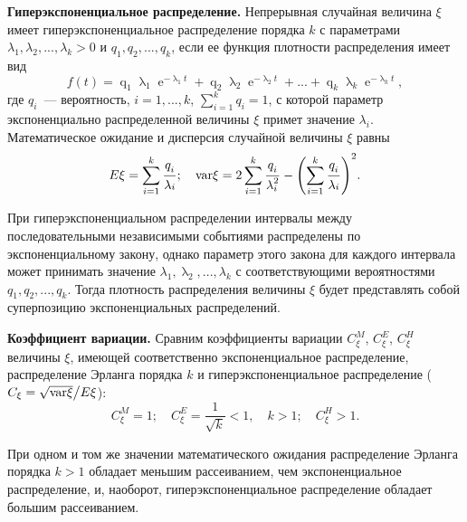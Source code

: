 \textbf{Гиперэкспоненциальное распределение.} Непрерывная случайная величина $\xi$ имеет гиперэкспоненциальное распределение порядка $k$ с параметрами $\lambda_1,\lambda_2,...,\lambda_k > 0$ и $q_1,q_2,...,q_k$, если ее функция плотности распределения имеет вид
\begin{equation*}
f(t) = \mathop q\nolimits_1 \mathop \lambda \nolimits_1 \mathop e\nolimits^{ - \mathop \lambda \nolimits_1 t}  + \mathop q\nolimits_2 \mathop \lambda \nolimits_2 \mathop e\nolimits^{ - \mathop \lambda \nolimits_2 t}  + ... + \mathop q\nolimits_k  \mathop \lambda \nolimits_k  \mathop e\nolimits^{ - \mathop \lambda \nolimits_k  t},
\end{equation*}
где $q_i$~--- вероятность, $i = 1,...,k$, $\sum\limits_{i = 1}^k  q_i = 1$, с которой параметр экспоненциально распределенной величины $\xi$ примет значение $\lambda_i$. Математическое ожидание и дисперсия случайной величины $\xi$ равны
\begin{equation*}
E\xi  = \sum\limits_{i = 1}^k  {\frac{{\mathop q\nolimits_i }}{{\mathop \lambda \nolimits_i }}}; \quad {\mathop{\rm var}} \xi  = 2\sum\limits_{i = 1}^k  {\frac{{\mathop q\nolimits_i }}{{\mathop \lambda \nolimits_i^2 }} - {{\left( {\sum\limits_{i = 1}^k  {\frac{{\mathop q\nolimits_i }}{{\mathop \lambda \nolimits_i }}} } \right)}^2}}.
\end{equation*}

При гиперэкспоненциальном распределении интервалы между последовательными независимыми событиями распределены по экспоненциальному закону, однако параметр этого закона для каждого интервала может принимать значение $\lambda_1 ,\mathop \lambda_2 ,...,\lambda_k$ с соответствующими вероятностями $q_1 ,q_2 ,...,q_k$. Тогда плотность распределения величины $\xi$ будет представлять собой суперпозицию экспоненциальных распределений.
	
\textbf{Коэффициент вариации.} Сравним коэффициенты вариации $C_\xi^M$,  $C_\xi^E$, $C_\xi^H$ величины $\xi$, имеющей соответственно экспоненциальное распределение, распределение Эрланга порядка $k$ и гиперэкспоненциальное распределение ($C_\xi = {{\sqrt {{\mathop{\rm var}} \xi } } \mathord{\left/
 {\vphantom {{\sqrt {{\mathop{\rm var}} \xi } } {E\xi }}} \right.
 \kern-\nulldelimiterspace} {E\xi }}$):
\begin{equation*}
C_\xi^M = 1; \quad C_\xi^E  = \frac{1}{{\sqrt k }} < 1, \quad k > 1; \quad C_\xi^H  > 1.
\end{equation*}

При одном и том же значении математического ожидания распределение Эрланга порядка $k>1$ обладает меньшим рассеиванием, чем экспоненциальное распределение,  и, наоборот, гиперэкспоненциальное распределение обладает большим рассеиванием.

